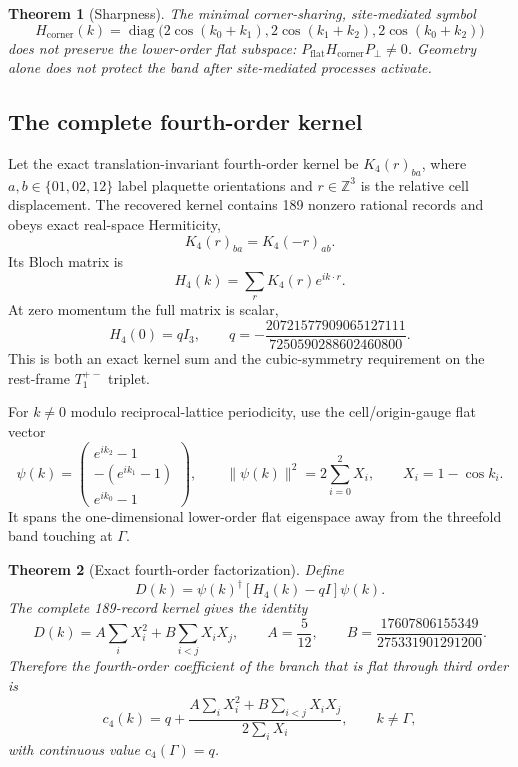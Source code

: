 \documentclass[11pt]{article}
\newtheorem{theorem}{Theorem}[section]
\begin{document}
\begin{theorem}[Sharpness]\label{thm:sharp}
The minimal corner-sharing, site-mediated symbol
\[
H_{\mathrm{corner}}(k)=\operatorname{diag}
\bigl(2\cos(k_0{+}k_1),2\cos(k_1{+}k_2),2\cos(k_0{+}k_2)\bigr)
\]
does not preserve the lower-order flat subspace:
$P_{\mathrm{flat}}H_{\mathrm{corner}}P_\perp\neq0$. Geometry alone does
not protect the band after site-mediated processes activate.
\end{theorem}

\subsection{The complete fourth-order kernel}

Let the exact translation-invariant fourth-order kernel be
$K_4(r)_{ba}$, where $a,b\in\{01,02,12\}$ label plaquette orientations and
$r\in\mathbb Z^3$ is the relative cell displacement. The recovered kernel
contains 189 nonzero rational records and obeys exact real-space
Hermiticity,
\[
K_4(r)_{ba}=K_4(-r)_{ab}.
\]
Its Bloch matrix is
\[
H_4(k)=\sum_rK_4(r)e^{ik\cdot r}.
\]
At zero momentum the full matrix is scalar,
\begin{equation}
H_4(0)=qI_3,
\qquad
q=-\frac{20721577909065127111}{7250590288602460800}.
\label{eq:qexact}
\end{equation}
This is both an exact kernel sum and the cubic-symmetry requirement on the
rest-frame $T_1^{+-}$ triplet.

For $k\neq0$ modulo reciprocal-lattice periodicity, use the cell/origin-gauge
flat vector
\begin{equation}
\psi(k)=
\begin{pmatrix}
e^{ik_2}-1\\
-(e^{ik_1}-1)\\
e^{ik_0}-1
\end{pmatrix},
\qquad
\|\psi(k)\|^2=2\sum_{i=0}^2X_i,
\qquad X_i=1-\cos k_i.
\label{eq:psicell}
\end{equation}
It spans the one-dimensional lower-order flat eigenspace away from the
threefold band touching at $\Gamma$.

\begin{theorem}[Exact fourth-order factorization]\label{thm:y4factor}
Define
\[
D(k)=\psi(k)^\dagger[H_4(k)-qI]\psi(k).
\]
The complete 189-record kernel gives the identity
\begin{equation}
D(k)=A\sum_iX_i^2+B\sum_{i<j}X_iX_j,
\qquad
A=\frac5{12},
\qquad
B=\frac{17607806155349}{275331901291200}.
\label{eq:Dfactor}
\end{equation}
Therefore the fourth-order coefficient of the branch that is flat through
third order is
\begin{equation}
c_4(k)=q+
\frac{A\sum_iX_i^2+B\sum_{i<j}X_iX_j}
{2\sum_iX_i},
\qquad k\neq\Gamma,
\label{eq:c4closed}
\end{equation}
with continuous value $c_4(\Gamma)=q$.
\end{theorem}
\end{document}
